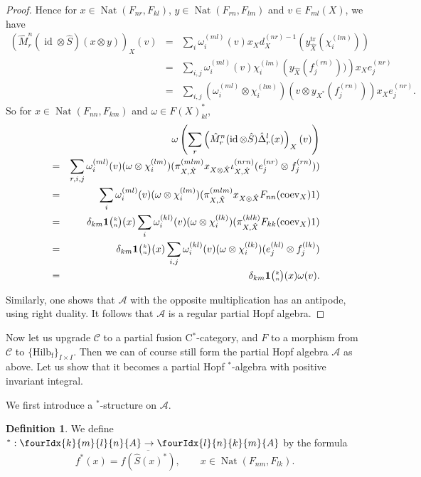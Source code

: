 \documentclass[11pt]{article}
\DeclareMathOperator{\fin}{\mathrm{f}}
\DeclareMathOperator{\id}{id}
\DeclareMathOperator{\Nat}{\mathrm{Nat}}
\DeclareMathOperator{\tr}{\mathrm{tr}}
\newcommand{\CatCC}{\mathscr{C}}
\newcommand{\Hilb}{\mathrm{Hilb}}
\newcommand{\coev}{\mathrm{coev}}
\newcommand{\Grt}[3]{#1{\tiny {\begin{pmatrix} #2\\#3\end{pmatrix}}}}
\newcommand{\UnitC}[2]{\Grt{\mathbf{1}}{#1}{#2}}
\newcommand{\Gr}[5]{\fourIdx{#2}{#4}{#3}{#5}{#1}}%
\theoremstyle{definition}
\newtheorem{Def}[Theorem]{Definition}
\numberwithin{equation}{section}
\begin{document}
\begin{proof}
Hence for $x\in \Nat(F_{nr},F_{kl})$, $y\in \Nat(F_{rn},F_{lm})$ and $v \in F_{ml}(X)$, we have \begin{eqnarray*} \left(\hat{M}^n_r(\id\otimes \hat{S})(x\otimes y)\right)_X(v) &=& \sum_i \omega_i^{(ml)}\left(v\right)  x_Xd_X^{(nr)-1}(y_{\hat{X}}^{\tr}(\chi_i^{(lm)}))\\ &=& \sum_{i,j} \omega_i^{(ml)}\left(v\right)  \chi_i^{(lm)}\left(y_{\hat{X}}(f_j^{(rn)}))\right)x_Xe_j^{(nr)} \\ &=& \sum_{i,j}(\omega_i^{(ml)}\otimes \chi_i^{(lm)})\left(v\otimes y_{X^*}(f_j^{(rn)})\right)x_Xe_j^{(nr)}.\end{eqnarray*} So for $ x\in \Nat(F_{nn},F_{km})$ and $\omega \in F(X)_{kl}^*$,  \begin{eqnarray*} && \hspace{-2cm} \omega\left(\sum_r\left(\hat{M}^n_r(\id\otimes \hat{S})\hat{\Delta}^l_r(x)\right)_X(v) \right) \\ &=& \sum_{r,i,j}
\omega_i^{(ml)}(v)(\omega\otimes \chi_i^{(lm)})(\pi_{X,\hat{X}}^{(mlm)}x_{X\otimes \hat{X}}\iota_{X,\hat{X}}^{(nrn)}(e_j^{(nr)}\otimes f_j^{(rn)})) \\
&=&  \sum_{i}
\omega_i^{(ml)}(v)(\omega\otimes \chi_i^{(lm)})(\pi_{X,\hat{X}}^{(mlm)}x_{X\otimes \hat{X}}F_{nn}(\coev_X)1)\\ &=&  \delta_{km} \UnitC{k}{n}(x)  \sum_{i}
\omega_i^{(kl)}(v)(\omega\otimes \chi_i^{(lk)})(\pi_{X,\hat{X}}^{(klk)}F_{kk}(\coev_X)1) \\ &=&  \delta_{km} \UnitC{k}{n}(x)  \sum_{i,j}
\omega_i^{(kl)}(v)(\omega\otimes \chi_i^{(lk)})(e_j^{(kl)}\otimes f_j^{(lk)}) \\ &=&  \delta_{km} \UnitC{k}{n}(x)  \omega(v).
\end{eqnarray*}

Similarly, one shows that $\mathscr{A}$ with the opposite multiplication has an antipode, using right duality. It follows that $\mathscr{A}$ is a regular partial Hopf algebra.  
\end{proof} 

Now let us upgrade $\CatCC$ to a partial fusion C$^*$-category, and $F$ to a morphism from $\CatCC$ to $\{\Hilb_{\fin}\}_{I\times I}$. Then we can of course still form the partial Hopf algebra $\mathscr{A}$ as above. Let us show that it becomes a partial Hopf $^*$-algebra with positive invariant integral.

We first introduce a $^*$-structure on $\mathscr{A}$. 

\begin{Def} We define $^*: \Gr{A}{k}{l}{m}{n}\rightarrow \Gr{A}{l}{k}{n}{m}$ by the formula \[f^*(x) = \overline{f(\hat{S}(x)^*)},\qquad x\in \Nat(F_{nm},F_{lk}).\]
\end{Def}
\end{document}
